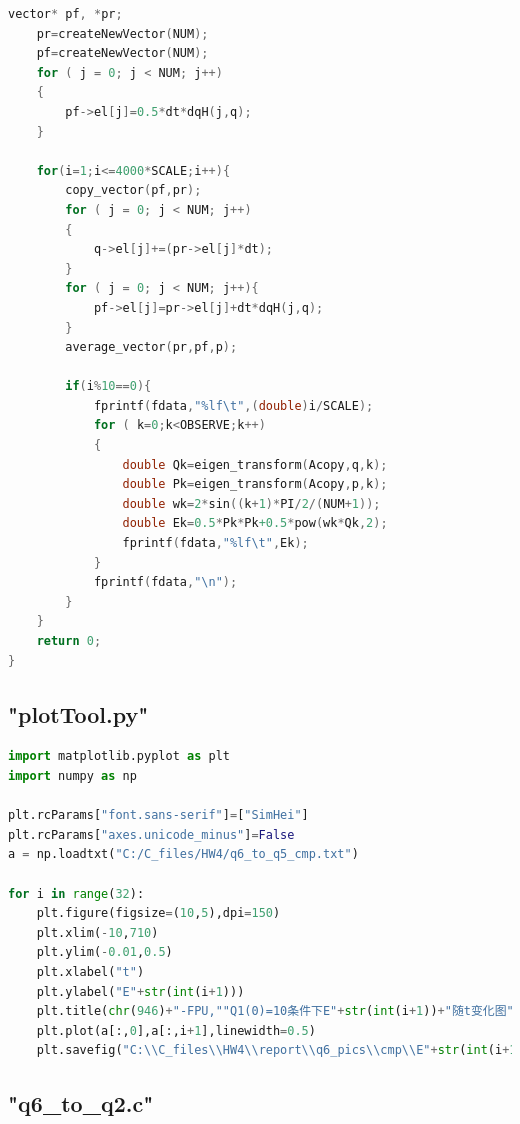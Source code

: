 \documentclass[10pt, a4paper]{article}
\begin{document}
\begin{lstlisting}[language=C]
    vector* pf, *pr;
    pr=createNewVector(NUM);
    pf=createNewVector(NUM);
    for ( j = 0; j < NUM; j++)
    {
        pf->el[j]=0.5*dt*dqH(j,q);
    }
    
    for(i=1;i<=4000*SCALE;i++){
        copy_vector(pf,pr);
        for ( j = 0; j < NUM; j++)
        {
            q->el[j]+=(pr->el[j]*dt);
        }
        for ( j = 0; j < NUM; j++){
            pf->el[j]=pr->el[j]+dt*dqH(j,q);
        }
        average_vector(pr,pf,p);
        
        if(i%10==0){
            fprintf(fdata,"%lf\t",(double)i/SCALE);
            for ( k=0;k<OBSERVE;k++)
            {
                double Qk=eigen_transform(Acopy,q,k);
                double Pk=eigen_transform(Acopy,p,k);
                double wk=2*sin((k+1)*PI/2/(NUM+1));
                double Ek=0.5*Pk*Pk+0.5*pow(wk*Qk,2);
                fprintf(fdata,"%lf\t",Ek);
            }
            fprintf(fdata,"\n");
        }
    }
    return 0;
}  
    \end{lstlisting}

    \subsection{"plotTool.py"}
    \begin{lstlisting}[language=Python]
import matplotlib.pyplot as plt
import numpy as np

plt.rcParams["font.sans-serif"]=["SimHei"]
plt.rcParams["axes.unicode_minus"]=False
a = np.loadtxt("C:/C_files/HW4/q6_to_q5_cmp.txt")

for i in range(32):
    plt.figure(figsize=(10,5),dpi=150)
    plt.xlim(-10,710)
    plt.ylim(-0.01,0.5)
    plt.xlabel("t")
    plt.ylabel("E"+str(int(i+1)))
    plt.title(chr(946)+"-FPU,""Q1(0)=10条件下E"+str(int(i+1))+"随t变化图")
    plt.plot(a[:,0],a[:,i+1],linewidth=0.5)
    plt.savefig("C:\\C_files\\HW4\\report\\q6_pics\\cmp\\E"+str(int(i+1))+".png")
    \end{lstlisting}

    \subsection{"q6_to_q2.c"}
\end{document}
